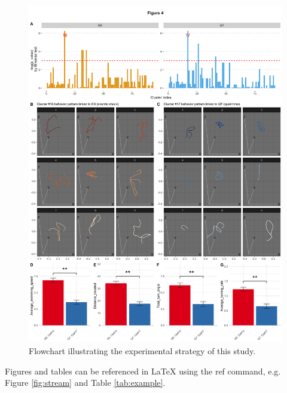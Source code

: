 \documentclass[fleqn,10pt]{wlscirep}
\begin{document}
\begin{figure}[ht]
\centering
\includegraphics[width=\linewidth]{Figure_4.png}
\caption{Flowchart illustrating the experimental strategy of this study.}
\label{fig:cluster}
\end{figure}

Figures and tables can be referenced in LaTeX using the ref command, e.g. Figure \ref{fig:stream} and Table \ref{tab:example}.
\end{document}
